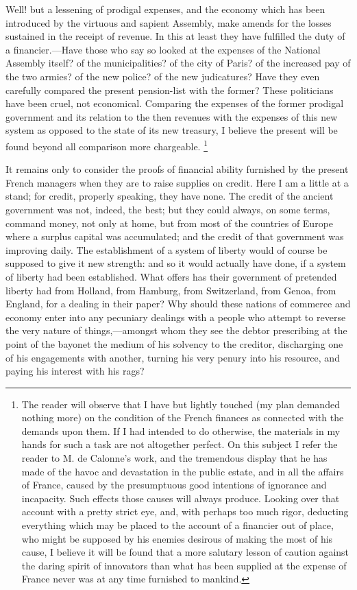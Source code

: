 Well! but a lessening of prodigal expenses, and the economy which has been introduced by the virtuous and sapient Assembly, make amends for the losses sustained in the receipt of revenue. In this at least they have fulfilled the duty of a financier.—Have those who say so looked at the expenses of the National Assembly itself? of the municipalities? of the city of Paris? of the increased pay of the two armies? of the new police? of the new judicatures? Have they even carefully compared the present pension-list with the former? These politicians have been cruel, not economical. Comparing the expenses of the former prodigal government and its relation to the then revenues with the expenses of this new system as opposed to the state of its new treasury, I believe the present will be found beyond all comparison more chargeable.
\footnote{ The reader will observe that I have but lightly touched (my plan demanded nothing more) on the condition of the French finances as connected with the demands upon them. If I had intended to do otherwise, the materials in my hands for such a task are not altogether perfect. On this subject I refer the reader to M. de Calonne's work, and the tremendous display that he has made of the havoc and devastation in the public estate, and in all the affairs of France, caused by the presumptuous good intentions of ignorance and incapacity. Such effects those causes will always produce. Looking over that account with a pretty strict eye, and, with perhaps too much rigor, deducting everything which may be placed to the account of a financier out of place, who might be supposed by his enemies desirous of making the most of his cause, I believe it will be found that a more salutary lesson of caution against the daring spirit of innovators than what has been supplied at the expense of France never was at any time furnished to mankind.}


It remains only to consider the proofs of financial ability furnished by the present French managers when they are to raise supplies on credit. Here I am a little at a stand; for credit, properly speaking, they have none. The credit of the ancient government was not, indeed, the best; but they could always, on some terms, command money, not only at home, but from most of the countries of Europe where a surplus capital was accumulated; and the credit of that government was improving daily. The establishment of a system of liberty would of course be supposed to give it new strength: and so it would actually have done, if a system of liberty had been established. What offers has their government of pretended liberty had from Holland, from Hamburg, from Switzerland, from Genoa, from England, for a dealing in their paper? Why should these nations of commerce and economy enter into any pecuniary dealings with a people who attempt to reverse the very nature of things,—amongst whom they see the debtor prescribing at the point of the bayonet the medium of his solvency to the creditor, discharging one of his engagements with another, turning his very penury into his resource, and paying his interest with his rags?

